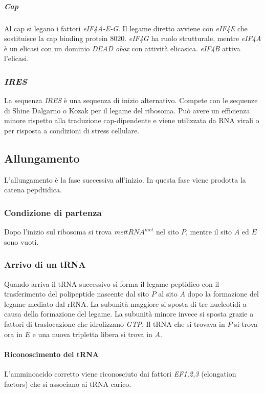 				\subparagraph{Cap}
				Al cap si legano i fattori \emph{eIF4A-E-G}.
				Il legame diretto avviene con \emph{eIF4E} che sostituisce la cap binding protein $8020$.
				\emph{eIF4G} ha ruolo strutturale, mentre \emph{eIF4A} \`e un elicasi con un dominio \emph{DEAD obox} con attivit\`a elicasica.
				\emph{eIF4B} attiva l'elicasi.





		\subsubsection{\emph{IRES}}
		La sequenza \emph{IRES} \`e una sequenza di inizio alternativo.
		Compete con le sequenze di Shine Dalgarno o Kozak per il legame del ribosoma.
		Pu\`o avere un efficienza minore rispetto alla traduzione cap-dipendente e viene utilizzata da RNA virali o per risposta a condizioni di stress cellulare.

	\subsection{Allungamento}
	L'allungamento \`e la fase successiva all'inizio.
	In questa fase viene prodotta la catena pepdtidica.
	
		\subsubsection{Condizione di partenza}
		Dopo l'inizio sul ribosoma si trova \emph{met$tRNA^{met}$} nel sito $P$, mentre il sito $A$ ed $E$ sono vuoti.

		\subsubsection{Arrivo di un tRNA}
		Quando arriva il tRNA successivo si forma il legame peptidico con il trasferimento del polipeptide nascente dal sito $P$ al sito $A$ dopo la formazione del legame mediato dal rRNA.
		La subunit\`a maggiore si sposta di tre nucleotidi a causa della formazione del legame.
		La subunit\`a minore invece si sposta grazie a fattori di traslocazione che idrolizzano \emph{GTP}.
		Il tRNA che si trovava in $P$ si trova ora in $E$ e una nuova tripletta libera si trova in $A$.

			\paragraph{Riconoscimento del tRNA}
			L'amminoacido corretto viene riconosciuto dai fattori \emph{EF1,2,3} (elongation factors) che si associano ai tRNA carico.

